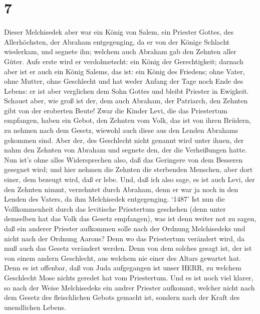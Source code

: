 \hypertarget{section-6}{%
\section{7}\label{section-6}}

 Dieser Melchisedek aber war ein König von Salem, ein
Priester Gottes, des Allerhöchsten, der Abraham entgegenging, da er von
der Könige Schlacht wiederkam, und segnete ihn;  welchem
auch Abraham gab den Zehnten aller Güter. Aufs erste wird er
verdolmetscht: ein König der Gerechtigkeit; darnach aber ist er auch ein
König Salems, das ist: ein König des Friedens;  ohne Vater,
ohne Mutter, ohne Geschlecht und hat weder Anfang der Tage noch Ende des
Lebens: er ist aber verglichen dem Sohn Gottes und bleibt Priester in
Ewigkeit.  Schauet aber, wie groß ist der, dem auch Abraham,
der Patriarch, den Zehnten gibt von der eroberten Beute! 
Zwar die Kinder Levi, die das Priestertum empfangen, haben ein Gebot,
den Zehnten vom Volk, das ist von ihren Brüdern, zu nehmen nach dem
Gesetz, wiewohl auch diese aus den Lenden Abrahams gekommen sind.
 Aber der, des Geschlecht nicht genannt wird unter ihnen,
der nahm den Zehnten von Abraham und segnete den, der die Verheißungen
hatte.  Nun ist's ohne alles Widersprechen also, daß das
Geringere von dem Besseren gesegnet wird;  und hier nehmen
die Zehnten die sterbenden Menschen, aber dort einer, dem bezeugt wird,
daß er lebe.  Und, daß ich also sage, es ist auch Levi, der
den Zehnten nimmt, verzehntet durch Abraham,  denn er war
ja noch in den Lenden des Vaters, da ihm Melchisedek entgegenging.
 `1487' Ist nun die Vollkommenheit durch das levitische
Priestertum geschehen (denn unter demselben hat das Volk das Gesetz
empfangen), was ist denn weiter not zu sagen, daß ein anderer Priester
aufkommen solle nach der Ordnung Melchisedeks und nicht nach der Ordnung
Aarons?  Denn wo das Priestertum verändert wird, da muß
auch das Gesetz verändert werden.  Denn von dem solches
gesagt ist, der ist von einem andern Geschlecht, aus welchem nie einer
des Altars gewartet hat.  Denn es ist offenbar, daß von
Juda aufgegangen ist unser HERR, zu welchem Geschlecht Mose nichts
geredet hat vom Priestertum.  Und es ist noch viel klarer,
so nach der Weise Melchisedeks ein andrer Priester aufkommt,
 welcher nicht nach dem Gesetz des fleischlichen Gebots
gemacht ist, sondern nach der Kraft des unendlichen Lebens.
